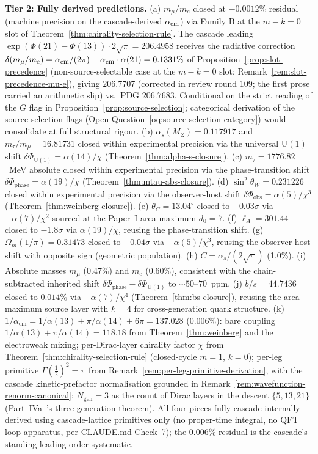 \documentclass[12pt,a4paper]{article}
\begin{document}
\textbf{Tier 2: Fully derived predictions.} (a) $m_\mu/m_e$ closed at $-0.0012\%$ residual (machine precision on the cascade-derived $\alpha_{\rm em}$) via Family B at the $m{-}k=0$ slot of Theorem~\ref{thm:chirality-selection-rule}. The cascade leading $\exp(\Phi(21)-\Phi(13))\cdot 2\sqrt{\pi}=206.4958$ receives the radiative correction $\delta(m_\mu/m_e) = \alpha_{\rm em}/(2\pi) + \alpha_{\rm em}\cdot\alpha(21) = 0.1331\%$ of Proposition~\ref{prop:slot-precedence} (non-source-selectable case at the $m{-}k=0$ slot; Remark~\ref{rem:slot-precedence-mu-e}), giving $206.7707$ (corrected in review round 109; the first prose carried an arithmetic slip) vs.\ PDG $206.7683$. Conditional on the strict reading of the $G$ flag in Proposition~\ref{prop:source-selection}; categorical derivation of the source-selection flags (Open Question~\ref{oq:source-selection-category}) would consolidate at full structural rigour. (b) $\alpha_s(M_Z)=0.117917$ and $m_\tau/m_\mu=16.81731$ closed within experimental precision via the universal $\mathrm{U}(1)$ shift $\delta\Phi_{\mathrm{U}(1)}=\alpha(14)/\chi$ (Theorem~\ref{thm:alpha-s-closure}). (c) $m_\tau = 1776.82$~MeV absolute closed within experimental precision via the phase-transition shift $\delta\Phi_{\mathrm{phase}}=\alpha(19)/\chi$ (Theorem~\ref{thm:mtau-abs-closure}). (d) $\sin^2\theta_W=0.231226$ closed within experimental precision via the observer-host shift $\delta\Phi_{\mathrm{obs}}=\alpha(5)/\chi^3$ (Theorem~\ref{thm:weinberg-closure}). (e) $\theta_C=13.04^\circ$ closed to $+0.03\sigma$ via $-\alpha(7)/\chi^2$ sourced at the Paper~I area maximum $d_0=7$. (f) $\ell_A=301.44$ closed to $-1.8\sigma$ via $\alpha(19)/\chi$, reusing the phase-transition shift. (g) $\Omega_m(1/\pi)=0.31473$ closed to $-0.04\sigma$ via $-\alpha(5)/\chi^3$, reusing the observer-host shift with opposite sign (geometric population). (h) $C = \alpha_s/(2\sqrt{\pi})$ (1.0\%). (i) Absolute masses $m_\mu$ (0.47\%) and $m_e$ (0.60\%), consistent with the chain-subtracted inherited shift $\delta\Phi_{\mathrm{phase}}-\delta\Phi_{\mathrm{U}(1)}$ to $\sim 50$--$70$~ppm. (j) $b/s = 44.7436$ closed to $0.014\%$ via $-\alpha(7)/\chi^4$ (Theorem~\ref{thm:bs-closure}), reusing the area-maximum source layer with $k=4$ for cross-generation quark structure. (k) $1/\alpha_{\mathrm{em}} = 1/\alpha(13) + \pi/\alpha(14) + 6\pi = 137.028$ ($0.006\%$): bare coupling $1/\alpha(13) + \pi/\alpha(14) = 118.18$ from Theorem~\ref{thm:weinberg} and the electroweak mixing; per-Dirac-layer chirality factor $\chi$ from Theorem~\ref{thm:chirality-selection-rule} (closed-cycle $m=1$, $k=0$); per-leg primitive $\Gamma(\tfrac{1}{2})^2 = \pi$ from Remark~\ref{rem:per-leg-primitive-derivation}, with the cascade kinetic-prefactor normalisation grounded in Remark~\ref{rem:wavefunction-renorm-canonical}; $N_{\mathrm{gen}}=3$ as the count of Dirac layers in the descent $\{5,13,21\}$ (Part~IVa~\cite{part4a}'s three-generation theorem). All four pieces fully cascade-internally derived using cascade-lattice primitives only (no proper-time integral, no QFT loop apparatus, per CLAUDE.md Check~7); the $0.006\%$ residual is the cascade's standing leading-order systematic.
\end{document}

